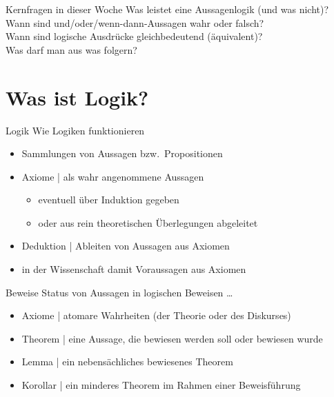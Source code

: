 \begin{frame}
  {Kernfragen in dieser Woche}
  \onslide<+->
  \onslide<+->
  \centering 
  \Large
  Was leistet eine \alert{Aussagenlogik} (und was nicht)?\\
  \Halbzeile
  \onslide<+->
  Wann sind \alert{und}\slash\alert{oder}\slash\alert{wenn-dann}-Aussagen wahr oder falsch?\\
  \Halbzeile
  \onslide<+->
  Wann sind logische Ausdrücke gleichbedeutend (äquivalent)?\\
  \onslide<+->
  \Halbzeile
  Was darf man aus was \alert{folgern}?\\
  \onslide<+->
  \Halbzeile
\end{frame}

\section{Was ist Logik?}

\begin{frame}
  {Logik}
  \onslide<+->
  \onslide<+->
  Wie Logiken funktionieren\\
  \Halbzeile
  \begin{itemize}[<+->]
    \item Sammlungen von Aussagen bzw.\ \alert{Propositionen}
    \item Axiome | als \alert{wahr angenommene} Aussagen
      \begin{itemize}[<+->]
        \item eventuell über Induktion gegeben
        \item oder aus rein theoretischen Überlegungen abgeleitet
      \end{itemize}
    \item \alert{Deduktion} | Ableiten von Aussagen aus Axiomen
    \item in der Wissenschaft damit \alert{Voraussagen} aus Axiomen
  \end{itemize}
\end{frame}

\begin{frame}
  {Beweise}
  \onslide<+->
  \onslide<+->
  Status von Aussagen in logischen Beweisen \ldots\\
  \Halbzeile
  \begin{itemize}[<+->]
    \item \alert{Axiome} | atomare Wahrheiten (der Theorie oder des Diskurses)
    \item \alert{Theorem} | eine Aussage, die bewiesen werden soll oder bewiesen wurde
    \item \alert{Lemma} | ein nebensächliches bewiesenes Theorem
    \item \alert{Korollar} | ein minderes Theorem im Rahmen einer Beweisführung
  \end{itemize}
\end{frame}

